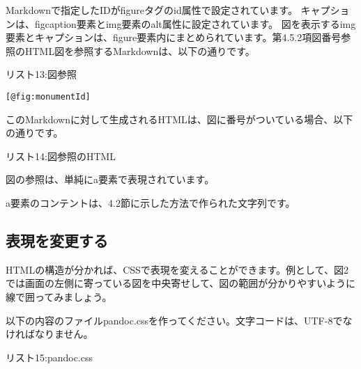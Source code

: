 Markdownで指定したIDがfigureタグのid属性で設定されています。
キャプションは、figcaption要素とimg要素のalt属性に設定されています。
図を表示するimg要素とキャプションは、figure要素内にまとめられています。第4.5.2項図番号参照のHTML図を参照するMarkdownは、以下の通りです。

リスト13:図参照

\begin{verbatim}
[@fig:monumentId]
\end{verbatim}

このMarkdownに対して生成されるHTMLは、図に番号がついている場合、以下の通りです。

リスト14:図参照のHTML

\begin{Shaded}
\begin{Highlighting}[]
\DataTypeTok{\textless{}}\OperatorTok{=}\DataTypeTok{\textgreater{}}\DataTypeTok{\textless{}/}\DataTypeTok{\textgreater{}}
\end{Highlighting}
\end{Shaded}

図の参照は、単純にa要素で表現されています。

a要素のコンテントは、4.2節に示した方法で作られた文字列です。

\subsection{表現を変更する}\label{ux8868ux73feux3092ux5909ux66f4ux3059ux308b}

HTMLの構造が分かれば、CSSで表現を変えることができます。例として、図2では画面の左側に寄っている図を中央寄せして、図の範囲が分かりやすいように線で囲ってみましょう。

以下の内容のファイルpandoc.cssを作ってください。文字コードは、UTF-8でなければなりません。

リスト15:pandoc.css

\begin{Shaded}
\begin{Highlighting}[]
\OperatorTok{\textgreater{}}
        \CharTok{:} \OperatorTok{;}
        \CharTok{:}   \OperatorTok{;}
        \CharTok{:} \OperatorTok{;}
\NormalTok{    \}}
\OperatorTok{\textgreater{}}
\end{Highlighting}
\end{Shaded}

